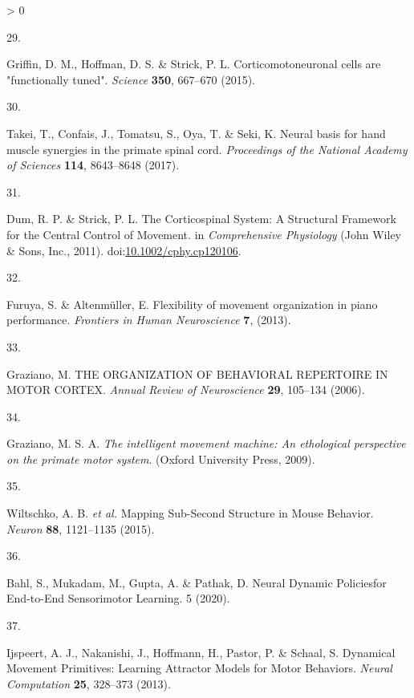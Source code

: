 \documentclass[
  a4paper,
]{article}
\newlength{\cslhangindent}
\newlength{\csllabelwidth}
\newenvironment{CSLReferences}[2] %
 {%
  \setlength{\parindent}{0pt}
  \ifodd #1 \everypar{\setlength{\hangindent}{\cslhangindent}}\ignorespaces\fi
  \ifnum #2 > 0
  \setlength{\parskip}{#2\baselineskip}
  \fi
 }%
 {}
\newcommand{\CSLLeftMargin}[1]{\parbox[t]{\csllabelwidth}{#1}}
\newcommand{\CSLRightInline}[1]{\parbox[t]{\linewidth - \csllabelwidth}{#1}\break}
\begin{document}
\begin{CSLReferences}{0}{0}
\leavevmode\hypertarget{ref-griffinCorticomotoneuronalCellsAre2015}{}%
\CSLLeftMargin{29. }
\CSLRightInline{Griffin, D. M., Hoffman, D. S. \& Strick, P. L.
Corticomotoneuronal cells are "functionally tuned". \emph{Science}
\textbf{350}, 667--670 (2015).}

\leavevmode\hypertarget{ref-Takei2017}{}%
\CSLLeftMargin{30. }
\CSLRightInline{Takei, T., Confais, J., Tomatsu, S., Oya, T. \& Seki, K.
Neural basis for hand muscle synergies in the primate spinal cord.
\emph{Proceedings of the National Academy of Sciences} \textbf{114},
8643--8648 (2017).}

\leavevmode\hypertarget{ref-dumCorticospinalSystemStructural2011}{}%
\CSLLeftMargin{31. }
\CSLRightInline{Dum, R. P. \& Strick, P. L. The {Corticospinal System}:
{A Structural Framework} for the {Central Control} of {Movement}. in
\emph{Comprehensive {Physiology}} ({John Wiley \& Sons, Inc.}, 2011).
doi:\href{https://doi.org/10.1002/cphy.cp120106}{10.1002/cphy.cp120106}.}

\leavevmode\hypertarget{ref-furuyaFlexibilityMovementOrganization2013}{}%
\CSLLeftMargin{32. }
\CSLRightInline{Furuya, S. \& Altenmüller, E. Flexibility of movement
organization in piano performance. \emph{Frontiers in Human
Neuroscience} \textbf{7}, (2013).}

\leavevmode\hypertarget{ref-grazianoORGANIZATIONBEHAVIORALREPERTOIRE2006}{}%
\CSLLeftMargin{33. }
\CSLRightInline{Graziano, M. {THE ORGANIZATION OF BEHAVIORAL REPERTOIRE
IN MOTOR CORTEX}. \emph{Annual Review of Neuroscience} \textbf{29},
105--134 (2006).}

\leavevmode\hypertarget{ref-grazianoIntelligentMovementMachine2009}{}%
\CSLLeftMargin{34. }
\CSLRightInline{Graziano, M. S. A. \emph{The intelligent movement
machine: An ethological perspective on the primate motor system}.
({Oxford University Press}, 2009).}

\leavevmode\hypertarget{ref-wiltschkoMappingSubSecondStructure2015}{}%
\CSLLeftMargin{35. }
\CSLRightInline{Wiltschko, A. B. \emph{et al.} Mapping {Sub}-{Second
Structure} in {Mouse Behavior}. \emph{Neuron} \textbf{88}, 1121--1135
(2015).}

\leavevmode\hypertarget{ref-bahlNeuralDynamicPoliciesfor2020}{}%
\CSLLeftMargin{36. }
\CSLRightInline{Bahl, S., Mukadam, M., Gupta, A. \& Pathak, D. Neural
{Dynamic Policiesfor End}-to-{End Sensorimotor Learning}. 5 (2020).}

\leavevmode\hypertarget{ref-ijspeertDynamicalMovementPrimitives2013}{}%
\CSLLeftMargin{37. }
\CSLRightInline{Ijspeert, A. J., Nakanishi, J., Hoffmann, H., Pastor, P.
\& Schaal, S. Dynamical {Movement Primitives}: {Learning Attractor
Models} for {Motor Behaviors}. \emph{Neural Computation} \textbf{25},
328--373 (2013).}

\end{CSLReferences}
\end{document}

